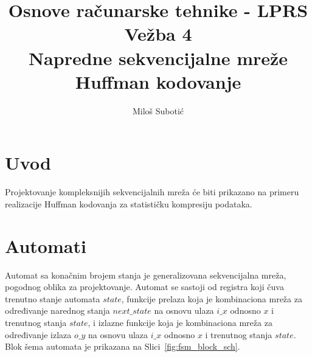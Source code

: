 \documentclass[12pt, a4paper]{article}
\begin{document}

\title{Osnove računarske tehnike - LPRS \\
Vežba 4 \\
Napredne sekvencijalne mreže \\
Huffman kodovanje
}
\author{Miloš Subotić}

\maketitle


\section{Uvod}
Projektovanje kompleksnijih sekvencijalnih mreža će biti prikazano na primeru realizacije
Huffman kodovanja za statističku kompresiju podataka.


\section{Automati}
Automat sa konačnim brojem stanja je generalizovana sekvencijalna mreža,
pogodnog oblika za projektovanje.
Automat se sastoji od registra koji čuva trenutno stanje automata $state$,
funkcije prelaza koja je kombinaciona mreža za određivanje narednog stanja $next\_state$
na osnovu ulaza $i\_x$ odnosno $x$ i trenutnog stanja $state$,
i izlazne funkcije koja je kombinaciona mreža za određivanje izlaza $o\_y$
na osnovu ulaza $i\_x$ odnosno $x$ i trenutnog stanja $state$.
Blok šema automata je prikazana na Slici~\ref{fig:fsm_block_sch}.
\end{document}
